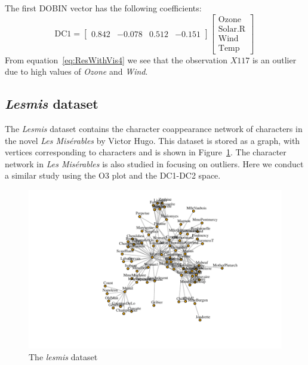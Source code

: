 \documentclass[a4paper,11pt]{article}
\begin{document}
\noindent
The first DOBIN vector has the following coefficients:
\begin{equation}\label{eq:ResWithVis4}
    \text{DC1} = \begin{bmatrix}
    0.842 & -0.078 &  0.512 & -0.151   
    \end{bmatrix}
    \begin{bmatrix}
    \text{Ozone} \\
    \text{Solar.R} \\
    \text{Wind} \\
    \text{Temp} 
    \end{bmatrix} \, 
\end{equation}
From equation~\eqref{eq:ResWithVis4} we see that the observation $X117$ is an outlier due to high values of \textit{Ozone} and \textit{Wind}. 

\subsection{\textit{Lesmis} dataset}\label{sec:ResWithVis5}
The \textit{Lesmis} dataset \citep{sombrero} contains the character coappearance network of characters in the novel \textit{Les Mis\'erables} by Victor Hugo. This dataset is stored as a graph, with vertices corresponding to characters and is shown in Figure~\ref{fig:lesmisgraph}. The character network in \textit{Les Mis\'erables} is also studied in \cite{wilkinson2017visualizing} focusing on outliers. Here we conduct a similar study using the O3 plot and the DC1-DC2 space. \\

\begin{figure}[!ht]
	\centering
	\includegraphics{lesmis.pdf}
	\caption{The \textit{lesmis} dataset }
	\label{fig:lesmisgraph}
\end{figure}
\end{document}
